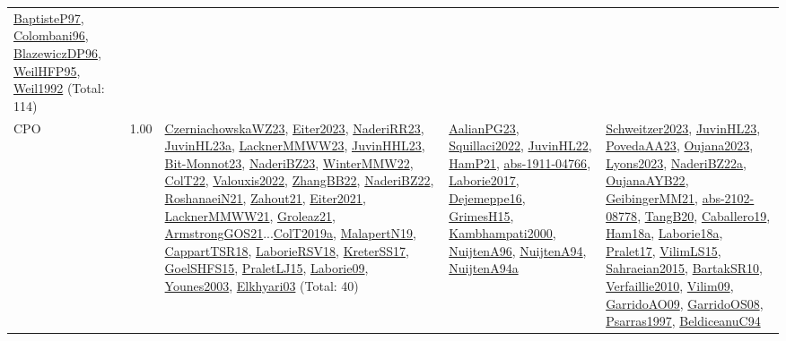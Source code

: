 {\begin{longtable}{p{3cm}r>{\raggedright\arraybackslash}p{6cm}>{\raggedright\arraybackslash}p{6cm}>{\raggedright\arraybackslash}p{8cm}}
\hyperref[detail:BaptisteP97]{BaptisteP97}, \hyperref[detail:Colombani96]{Colombani96}, \hyperref[detail:BlazewiczDP96]{BlazewiczDP96}, \hyperref[detail:WeilHFP95]{WeilHFP95}, \hyperref[detail:Weil1992]{Weil1992} (Total: 114)\\
\index{CPO}\index{CPSystems!CPO}CPO &  1.00 & \hyperref[detail:CzerniachowskaWZ23]{CzerniachowskaWZ23}, \hyperref[detail:Eiter2023]{Eiter2023}, \hyperref[detail:NaderiRR23]{NaderiRR23}, \hyperref[detail:JuvinHL23a]{JuvinHL23a}, \hyperref[detail:LacknerMMWW23]{LacknerMMWW23}, \hyperref[detail:JuvinHHL23]{JuvinHHL23}, \hyperref[detail:Bit-Monnot23]{Bit-Monnot23}, \hyperref[detail:NaderiBZ23]{NaderiBZ23}, \hyperref[detail:WinterMMW22]{WinterMMW22}, \hyperref[detail:ColT22]{ColT22}, \hyperref[detail:Valouxis2022]{Valouxis2022}, \hyperref[detail:ZhangBB22]{ZhangBB22}, \hyperref[detail:NaderiBZ22]{NaderiBZ22}, \hyperref[detail:RoshanaeiN21]{RoshanaeiN21}, \hyperref[detail:Zahout21]{Zahout21}, \hyperref[detail:Eiter2021]{Eiter2021}, \hyperref[detail:LacknerMMWW21]{LacknerMMWW21}, \hyperref[detail:Groleaz21]{Groleaz21}, \hyperref[detail:ArmstrongGOS21]{ArmstrongGOS21}...\hyperref[detail:ColT2019a]{ColT2019a}, \hyperref[detail:MalapertN19]{MalapertN19}, \hyperref[detail:CappartTSR18]{CappartTSR18}, \hyperref[detail:LaborieRSV18]{LaborieRSV18}, \hyperref[detail:KreterSS17]{KreterSS17}, \hyperref[detail:GoelSHFS15]{GoelSHFS15}, \hyperref[detail:PraletLJ15]{PraletLJ15}, \hyperref[detail:Laborie09]{Laborie09}, \hyperref[detail:Younes2003]{Younes2003}, \hyperref[detail:Elkhyari03]{Elkhyari03} (Total: 40) & \hyperref[detail:AalianPG23]{AalianPG23}, \hyperref[detail:Squillaci2022]{Squillaci2022}, \hyperref[detail:JuvinHL22]{JuvinHL22}, \hyperref[detail:HamP21]{HamP21}, \hyperref[detail:abs-1911-04766]{abs-1911-04766}, \hyperref[detail:Laborie2017]{Laborie2017}, \hyperref[detail:Dejemeppe16]{Dejemeppe16}, \hyperref[detail:GrimesH15]{GrimesH15}, \hyperref[detail:Kambhampati2000]{Kambhampati2000}, \hyperref[detail:NuijtenA96]{NuijtenA96}, \hyperref[detail:NuijtenA94]{NuijtenA94}, \hyperref[detail:NuijtenA94a]{NuijtenA94a} & \hyperref[detail:Schweitzer2023]{Schweitzer2023}, \hyperref[detail:JuvinHL23]{JuvinHL23}, \hyperref[detail:PovedaAA23]{PovedaAA23}, \hyperref[detail:Oujana2023]{Oujana2023}, \hyperref[detail:Lyons2023]{Lyons2023}, \hyperref[detail:NaderiBZ22a]{NaderiBZ22a}, \hyperref[detail:OujanaAYB22]{OujanaAYB22}, \hyperref[detail:GeibingerMM21]{GeibingerMM21}, \hyperref[detail:abs-2102-08778]{abs-2102-08778}, \hyperref[detail:TangB20]{TangB20}, \hyperref[detail:Caballero19]{Caballero19}, \hyperref[detail:Ham18a]{Ham18a}, \hyperref[detail:Laborie18a]{Laborie18a}, \hyperref[detail:Pralet17]{Pralet17}, \hyperref[detail:VilimLS15]{VilimLS15}, \hyperref[detail:Sahraeian2015]{Sahraeian2015}, \hyperref[detail:BartakSR10]{BartakSR10}, \hyperref[detail:Verfaillie2010]{Verfaillie2010}, \hyperref[detail:Vilim09]{Vilim09}, \hyperref[detail:GarridoAO09]{GarridoAO09}, \hyperref[detail:GarridoOS08]{GarridoOS08}, \hyperref[detail:Psarras1997]{Psarras1997}, \hyperref[detail:BeldiceanuC94]{BeldiceanuC94}\\

\end{longtable}}
